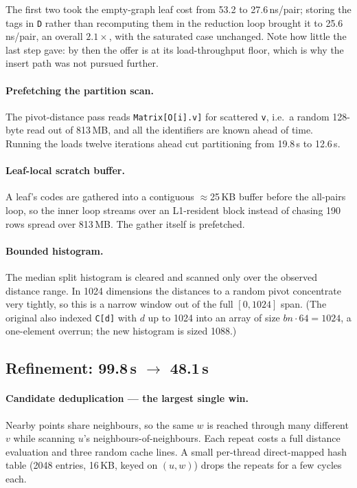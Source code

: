 \documentclass[11pt,a4paper]{article}
\newcommand{\code}[1]{\texttt{\small #1}}
\begin{document}
\noindent
The first two took the empty-graph leaf cost from 53.2 to 27.6\,ns/pair; storing
the tags in \code{D} rather than recomputing them in the reduction loop brought it
to 25.6\,ns/pair, an overall $2.1\times$, with the saturated case unchanged. Note
how little the last step gave: by then the offer is at its load-throughput floor,
which is why the insert path was not pursued further.

\paragraph{Prefetching the partition scan.} The pivot-distance pass reads
\code{Matrix[O[i].v]} for scattered \code{v}, i.e.\ a random 128-byte read out
of 813\,MB, and all the identifiers are known ahead of time. Running the loads
twelve iterations ahead cut partitioning from 19.8\,s to 12.6\,s.

\paragraph{Leaf-local scratch buffer.} A leaf's codes are gathered into a
contiguous $\approx$25\,KB buffer before the all-pairs loop, so the inner loop
streams over an L1-resident block instead of chasing 190 rows spread over
813\,MB. The gather itself is prefetched.

\paragraph{Bounded histogram.} The median split histogram is cleared and scanned
only over the observed distance range. In 1024 dimensions the distances to a
random pivot concentrate very tightly, so this is a narrow window out of the
full $[0, 1024]$ span. (The original also indexed \code{C[d]} with $d$ up to
1024 into an array of size $bn \cdot 64 = 1024$, a one-element overrun; the new
histogram is sized 1088.)

\subsection{Refinement: 99.8\,s $\rightarrow$ 48.1\,s}

\paragraph{Candidate deduplication --- the largest single win.} Nearby points
share neighbours, so the same $w$ is reached through many different $v$ while
scanning $u$'s neighbours-of-neighbours. Each repeat costs a full distance
evaluation and three random cache lines. A small per-thread direct-mapped hash
table (2048 entries, 16\,KB, keyed on $(u,w)$) drops the repeats for a few
cycles each.
\end{document}
